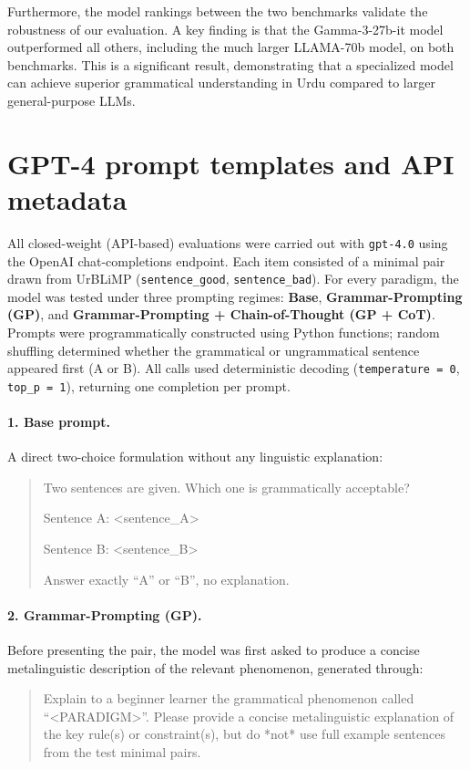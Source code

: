 \documentclass[11pt]{article}
\begin{document}
Furthermore, the model rankings between the two benchmarks validate the robustness of our evaluation. A key finding is that the Gamma-3-27b-it model outperformed all others, including the much larger LLAMA-70b model, on both benchmarks. This is a significant result, demonstrating that a specialized model can achieve superior grammatical understanding in Urdu compared to larger general-purpose LLMs.
\section{GPT-4 prompt templates and API metadata}
\label{appendix:prompts}

All closed-weight (API-based) evaluations were carried out with \texttt{gpt-4.0} using the OpenAI chat-completions endpoint. 
Each item consisted of a minimal pair drawn from UrBLiMP (\texttt{sentence\_good}, \texttt{sentence\_bad}).  
For every paradigm, the model was tested under three prompting regimes: \textbf{Base}, \textbf{Grammar-Prompting (GP)}, and \textbf{Grammar-Prompting + Chain-of-Thought (GP + CoT)}.  
Prompts were programmatically constructed using Python functions; random shuffling determined whether the grammatical or ungrammatical sentence appeared first (A or B).  
All calls used deterministic decoding (\texttt{temperature = 0}, \texttt{top\_p = 1}), returning one completion per prompt.

\paragraph{1. Base prompt.}
A direct two-choice formulation without any linguistic explanation:
\begin{quote}
Two sentences are given. Which one is grammatically acceptable?  

Sentence A: <sentence\_A>  

Sentence B: <sentence\_B>  

Answer exactly ``A'' or ``B'', no explanation.
\end{quote}

\paragraph{2. Grammar-Prompting (GP).}
Before presenting the pair, the model was first asked to produce a concise metalinguistic description of the relevant phenomenon, generated through:
\begin{quote}
Explain to a beginner learner the grammatical phenomenon called ``<PARADIGM>''.  
Please provide a concise metalinguistic explanation of the key rule(s) or constraint(s), but do *not* use full example sentences from the test minimal pairs.
\end{quote}
\end{document}
